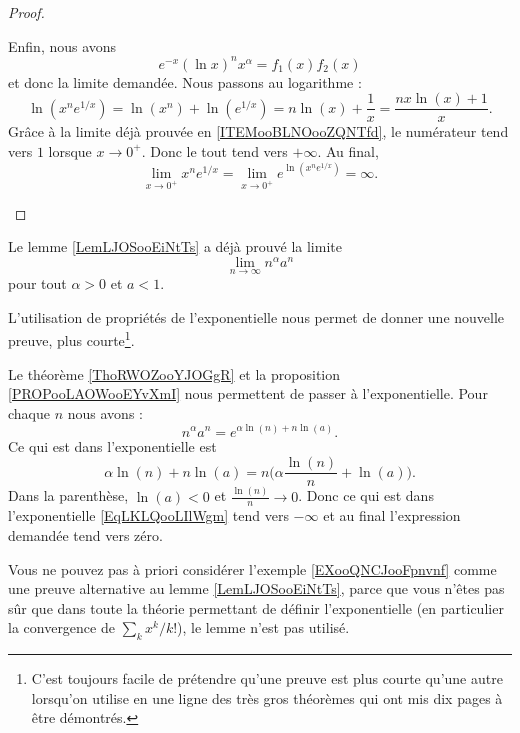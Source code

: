 \begin{proof}
\begin{subproof}
        Enfin, nous avons
        \begin{equation}
            e^{-x}(\ln x)^nx^{\alpha}=f_1(x)f_2(x)
        \end{equation}
        et donc la limite demandée.
		Nous passons au logarithme :
		\begin{equation}
			\ln(x^n e^{1/x})=\ln(x^n)+\ln( e^{1/x})=n\ln(x)+\frac{1}{ x }=\frac{ n x\ln(x)+1 }{ x }.
		\end{equation}
		Grâce à la limite déjà prouvée en \ref{ITEMooBLNOooZQNTfd}, le numérateur tend vers \( 1\) lorsque \( x\to 0^+\). Donc le tout tend vers \( +\infty\). Au final,
		\begin{equation}
			\lim_{x\to 0^+} x^n e^{1/x}=\lim_{x\to 0^+}  e^{\ln(x^n e^{1/x})}=\infty.
		\end{equation}
	\end{subproof}
\end{proof}

\begin{example}     \label{EXooQNCJooFpnvnf}
	Le lemme \ref{LemLJOSooEiNtTs} a déjà prouvé la limite
	\begin{equation}
		\lim_{n\to \infty} n^{\alpha}a^n
	\end{equation}
	pour tout \( \alpha>0\) et \( a<1\).

	L'utilisation de propriétés de l'exponentielle nous permet de donner une nouvelle preuve, plus courte\footnote{C'est toujours facile de prétendre qu'une preuve est plus courte qu'une autre lorsqu'on utilise en une ligne des très gros théorèmes qui ont mis dix pages à être démontrés.}.

	Le théorème \ref{ThoRWOZooYJOGgR} et la proposition \ref{PROPooLAOWooEYvXmI} nous permettent de passer à l'exponentielle. Pour chaque \( n\) nous avons :
	\begin{equation}        \label{EqLKLQooLIlWgm}
		n^{\alpha}a^n= e^{\alpha\ln(n)+n\ln(a)}.
	\end{equation}
	Ce qui est dans l'exponentielle est
	\begin{equation}
		\alpha\ln(n)+n\ln(a)=n\big(\alpha \frac{ \ln(n) }{ n }+\ln(a) \big).
	\end{equation}
	Dans la parenthèse, \( \ln(a)<0\) et \( \frac{ \ln(n) }{ n }\to 0\). Donc ce qui est dans l'exponentielle \eqref{EqLKLQooLIlWgm} tend vers \( -\infty\) et au final l'expression demandée tend vers zéro.
\end{example}

\begin{remark}
	Vous ne pouvez pas à priori considérer l'exemple \ref{EXooQNCJooFpnvnf} comme une preuve alternative au lemme \ref{LemLJOSooEiNtTs}, parce que vous n'êtes pas sûr que dans toute la théorie permettant de définir l'exponentielle (en particulier la convergence de \( \sum_kx^k/k!\)), le lemme n'est pas utilisé.
\end{remark}


